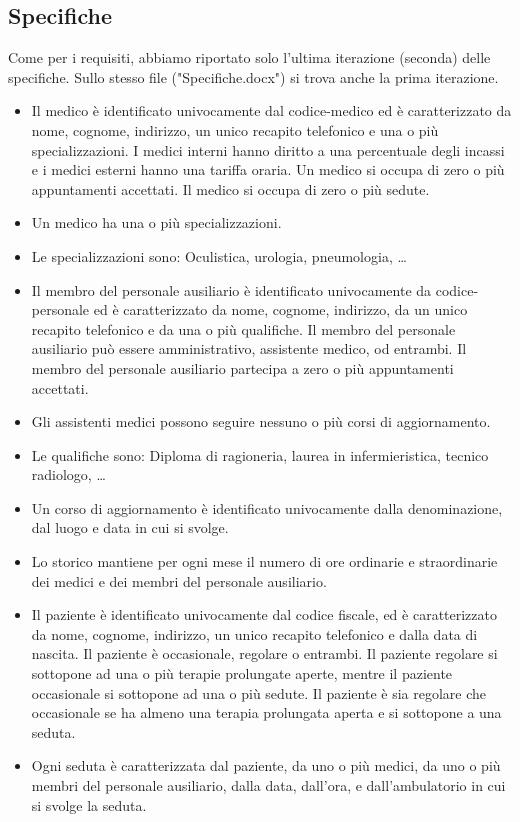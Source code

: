\documentclass[11pt]{article}
\begin{document}
\subsection{Specifiche}
Come per i requisiti, abbiamo riportato solo l'ultima iterazione (seconda) delle specifiche.
Sullo stesso file ("Specifiche.docx") si trova anche la prima iterazione.
\begin{itemize}
    \item Il medico è identificato univocamente dal codice-medico ed è caratterizzato da nome, cognome, indirizzo, un unico recapito telefonico e una o più specializzazioni. I medici interni hanno diritto a una percentuale degli incassi e i medici esterni hanno una tariffa oraria. Un medico si occupa di zero o più appuntamenti accettati. Il medico si occupa di zero o più sedute.
    \item Un medico ha una o più specializzazioni.
    \item Le specializzazioni sono: Oculistica, urologia, pneumologia, …
    \item Il membro del personale ausiliario è identificato univocamente da codice-personale ed è caratterizzato da nome, cognome, indirizzo, da un unico recapito telefonico e da una o più qualifiche. Il membro del personale ausiliario può essere amministrativo, assistente medico, od entrambi. Il membro del personale ausiliario partecipa a zero o più appuntamenti accettati.
    \item Gli assistenti medici possono seguire nessuno o più corsi di aggiornamento.
    \item Le qualifiche sono: Diploma di ragioneria, laurea in infermieristica, tecnico radiologo, …
    \item Un corso di aggiornamento è identificato univocamente dalla denominazione, dal luogo e data in cui si svolge.
    \item Lo storico mantiene per ogni mese il numero di ore ordinarie e straordinarie dei medici e dei membri del personale ausiliario.
    \item Il paziente è identificato univocamente dal codice fiscale, ed è caratterizzato da nome, cognome, indirizzo, un unico recapito telefonico e dalla data di nascita. Il paziente è occasionale, regolare o entrambi. Il paziente regolare si sottopone ad una o più terapie prolungate aperte, mentre il paziente occasionale si sottopone ad una o più sedute. Il paziente è sia regolare che occasionale se ha almeno una terapia prolungata aperta e si sottopone a una seduta.
    \item Ogni seduta è caratterizzata dal paziente, da uno o più medici, da uno o più membri del personale ausiliario, dalla data, dall’ora, e dall’ambulatorio in cui si svolge la seduta.

\end{itemize}
\end{document}
